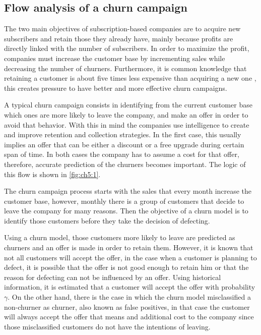 \subsection{Flow analysis of a churn campaign}
\label{sec:5:1:intro}

The two main objectives of subscription-based companies are to  acquire new subscribers and 
retain those they already have, mainly because profits are directly linked with the number of 
subscribers.  In order to maximize the profit, companies must increase the customer base by 
incrementing sales  while decreasing the number of churners. Furthermore, it is common knowledge 
that retaining a  customer is about five times less expensive than acquiring a new one 
\citep{Farris2010}, this creates  pressure to have better and more effective churn campaigns.

A typical churn campaign consists in identifying from the current customer base which ones are 
more likely to leave the company, and make an offer in order to avoid that behavior.
With this in mind the companies use intelligence to create and improve retention and collection
strategies. In the first case, this usually implies an offer that can be either a discount or a 
free upgrade during certain span of time. In both cases the company has to 	assume a cost for that 
offer, therefore, accurate prediction of the churners becomes important. The logic of this flow is 
shown in \figurename{ \ref{fig:ch5:1}}.

The churn campaign process starts with the sales that every month increase the customer 
base, however, monthly there is a group of customers that decide to leave the company for many 
reasons. Then the objective of a churn model is to identify those customers before they take the 
decision of defecting.

Using a churn model, those customers more likely to leave are predicted as churners and 
an offer is made in order to retain them. However, it is known that not all customers will accept 
the offer, in the case when a customer is planning to defect, it is possible that the offer is not 
good enough to retain him or that the reason for defecting can not be influenced by an offer.
Using historical information, it is estimated that a customer will accept the offer with 
probability $\gamma$.
On the other hand, there is the case in which the churn model misclassified a non-churner as 
churner, also known as false positives, in that case the customer will always accept the offer that 
means and additional cost to the company since those misclassified customers do not have the 
intentions of leaving.

